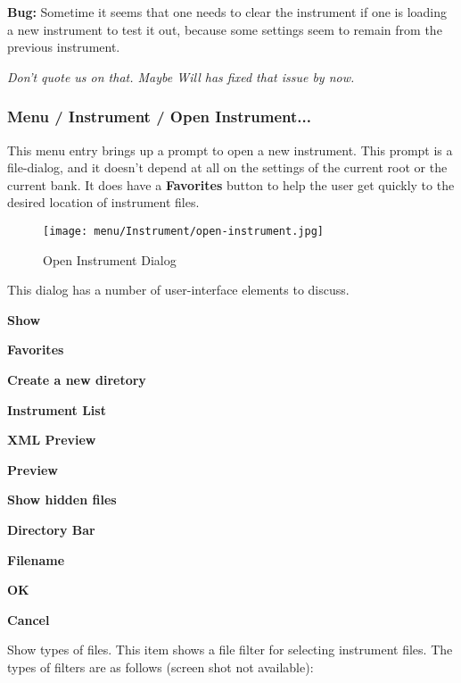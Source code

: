    \textbf{Bug:}
   Sometime it seems that one needs to clear the instrument if one is
   loading a new instrument to test it out, because some settings seem
   to remain from the previous instrument.

   \textsl{Don't quote us on that.  Maybe Will has fixed that issue by now.}

\subsubsection{Menu / Instrument / Open Instrument...}
\label{subsubsec:menu_instrument_open}

   This menu entry brings up a prompt to open a new instrument.
   This prompt is a file-dialog, and it doesn't depend at all on the settings
   of the current root or the current bank.  It does have a
   \textbf{Favorites} button to help the user get quickly to the desired
   location of instrument files.

\begin{figure}[H]
   \centering 
   \texttt{[image: menu/Instrument/open-instrument.jpg]}
   \caption{Open Instrument Dialog}
   \label{fig:open_instrument_dialog}
\end{figure}

   This dialog has a number of user-interface elements to discuss.

   \begin{enumber}
      \item \textbf{Show}
      \item \textbf{Favorites}
      \item \textbf{Create a new diretory}
      \item \textbf{Instrument List}
      \item \textbf{XML Preview}
      \item \textbf{Preview}
      \item \textbf{Show hidden files}
      \item \textbf{Directory Bar}
      \item \textbf{Filename}
      \item \textbf{OK}
      \item \textbf{Cancel}
   \end{enumber}

   \setcounter{ItemCounter}{0}      %

   Show types of files.
   This item shows a file filter for selecting instrument files.
   The types of filters are as follows (screen shot not available):

